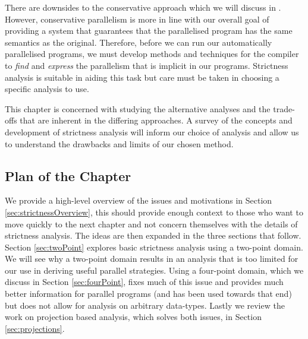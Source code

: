 There are downsides to the conservative approach which we will discuss in
. However, conservative parallelism is more in
line with our overall goal of providing a system that guarantees that the
parallelised program has the same semantics as the original. Therefore, before
we can run our automatically parallelised programs, we must develop methods and
techniques for the compiler to \emph{find} and \emph{express} the parallelism
that is implicit in our programs. Strictness analysis is suitable in aiding
this task but care must be taken in choosing a specific analysis to use.

This chapter is concerned with studying the alternative analyses and the
trade-offs that are inherent in the differing approaches. A survey of the
concepts and development of strictness analysis will inform our choice of
analysis and allow us to understand the drawbacks and limits of our chosen
method.

\subsection*{Plan of the Chapter}

We provide a high-level overview of the issues and motivations in Section
\ref{sec:strictnessOverview}, this should provide enough context to those who
want to move quickly to the next chapter and not concern themselves with the
details of strictness analysis. The ideas are then expanded in the three
sections that follow. Section \ref{sec:twoPoint} explores basic strictness
analysis using a two-point domain. We will see why a two-point domain results
in an analysis that is too limited for our use in deriving useful parallel
strategies. Using a four-point domain, which we discuss in Section
\ref{sec:fourPoint}, fixes much of this issue and provides much better
information for parallel programs (and has been used towards that end) but does
not allow for analysis on arbitrary data-types. Lastly we review the work on
projection based analysis, which solves both issues, in Section
\ref{sec:projections}.
